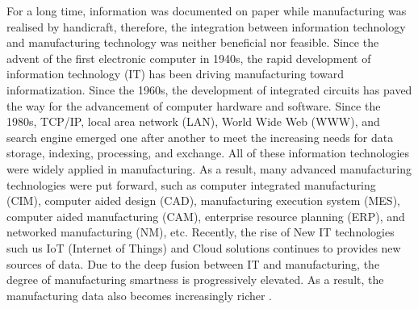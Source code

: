 For a long time, information was documented on paper while manufacturing was realised by handicraft, therefore, the integration between information technology and manufacturing technology was neither beneficial nor feasible. Since the advent of the first electronic computer in 1940s, the rapid development of information technology (IT) has been driving manufacturing toward informatization. Since the 1960s, the development of integrated circuits has paved the way for the advancement of computer hardware and software. Since the 1980s, TCP/IP, local area network (LAN), World Wide Web (WWW), and search engine emerged one after another to meet the increasing needs for data storage, indexing, processing, and exchange. All of these information technologies were widely applied in manufacturing. As a result, many advanced manufacturing technologies were put forward, such as computer integrated manufacturing (CIM), computer aided design (CAD), manufacturing execution system (MES), computer aided manufacturing (CAM), enterprise resource planning (ERP), and networked manufacturing (NM), etc. Recently, the rise of New IT technologies such us IoT (Internet of Things) and Cloud solutions continues to provides new sources of data. Due to the deep fusion between IT and manufacturing, the degree of manufacturing smartness is progressively elevated. As a result, the manufacturing data also becomes increasingly richer \citep{tao2018data}.

